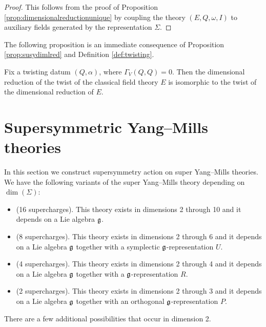 \documentclass[10pt, oneside]{article}
\begin{document}
\begin{proof}
This follows from the proof of Proposition \ref{prop:dimensionalreductionunique} by coupling the theory $(E, Q, \omega, I)$ to auxiliary fields generated by the representation $\Sigma$.
\end{proof}

The following proposition is an immediate consequence of Proposition \ref{prop:susydimlred} and Definition \ref{def:twisting}.

\begin{prop}
Fix a twisting datum $(Q, \alpha)$, where $\Gamma_V(Q, Q) = 0$. Then the dimensional reduction of the twist of the classical field theory $E$ is isomorphic to the twist of the dimensional reduction of $E$.
\label{prop:twistdimensionalreduction}
\end{prop}

\section{Supersymmetric Yang--Mills theories} \label{sec:SYM}

In this section we construct supersymmetry action on super Yang--Mills theories. We have the following variants of the super Yang--Mills theory depending on $\dim(\Sigma)$:
\begin{itemize}
\item (16 supercharges). This theory exists in dimensions 2 through 10 and it depends on a Lie algebra $\mathfrak g$.

\item (8 supercharges). This theory exists in dimensions 2 through 6 and it depends on a Lie algebra $\mathfrak g$ together with a symplectic $\mathfrak g$-representation $U$.

\item (4 supercharges). This theory exists in dimensions 2 through 4 and it depends on a Lie algebra $\mathfrak g$ together with a $\mathfrak g$-representation $R$.

\item (2 supercharges). This theory exists in dimensions 2 through 3 and it depends on a Lie algebra $\mathfrak g$ together with an orthogonal $\mathfrak g$-representation $P$.
\end{itemize}

There are a few additional possibilities that occur in dimension 2.
\end{document}

